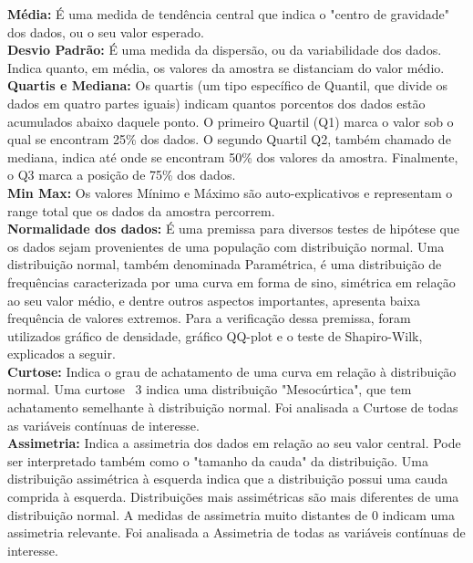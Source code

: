 \documentclass[a4paper, 12pt]{article} %
\begin{document}
\textbf{Média:} É uma medida de tendência central que indica o "centro de gravidade" dos dados, ou o seu valor esperado.\\

\textbf{Desvio Padrão:} É uma medida da dispersão, ou da variabilidade dos dados. Indica quanto, em média, os valores da amostra se distanciam do valor médio.\\

\textbf{Quartis e Mediana:} Os quartis (um tipo específico de Quantil, que divide os dados em quatro partes iguais) indicam quantos porcentos dos dados estão acumulados abaixo daquele ponto. O primeiro Quartil (Q1) marca o valor sob o qual se encontram 25\% dos dados. O segundo Quartil Q2, também chamado de mediana, indica até onde se encontram 50\% dos valores da amostra. Finalmente, o Q3 marca a posição de 75\% dos dados.\\

\textbf{Min Max:} Os valores Mínimo e Máximo são auto-explicativos e representam o range total que os dados da amostra percorrem.\\

\textbf{Normalidade dos dados:} É uma premissa para diversos testes de hipótese que os dados sejam provenientes de uma população com distribuição normal. Uma distribuição normal, também denominada Paramétrica, é uma distribuição de frequências caracterizada por uma curva em forma de sino, simétrica em relação ao seu valor médio, e dentre outros aspectos importantes, apresenta baixa frequência de valores extremos. Para a verificação dessa premissa, foram utilizados gráfico de densidade, gráfico QQ-plot e o teste de Shapiro-Wilk, explicados a seguir.  \\

\textbf{Curtose:} Indica o grau de achatamento de uma curva em relação à distribuição normal. Uma curtose ~3 indica uma distribuição "Mesocúrtica", que tem achatamento semelhante à distribuição normal. Foi analisada a Curtose de todas as variáveis contínuas de interesse.\\

\textbf{Assimetria:} Indica a assimetria dos dados em relação ao seu valor central. Pode ser interpretado também como o "tamanho da cauda"  da distribuição. Uma distribuição assimétrica à esquerda indica que a distribuição possui uma cauda comprida à esquerda. Distribuições mais assimétricas são mais diferentes de uma distribuição normal. A medidas de assimetria muito distantes de 0 indicam uma assimetria relevante. Foi analisada a Assimetria de todas as variáveis contínuas de interesse.\\
\end{document}
